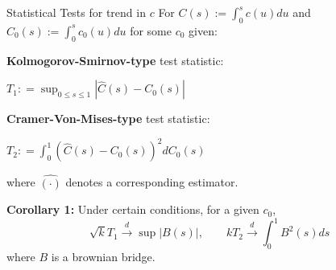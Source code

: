 \documentclass[notes]{beamer}
\begin{document}
\begin{frame}{Statistical Tests for trend in $c$}
For $C(s) := \displaystyle \int_0^s c (u) du$ and $C_0(s) := \displaystyle \int_0^s c_0 (u) du $ for some $c_0$ given: \pause

\textbf{Kolmogorov-Smirnov-type} test statistic:
\begin{center} {$T_1 : = \displaystyle \sup_{0 \le s \le 1} | \hat{C}(s) - C_0 (s) |$} \end{center}

\textbf{Cramer-Von-Mises-type} test statistic:
\begin{center} {$T_2 : = \displaystyle \int_0^1 \left( \hat{C}(s) - C_0 (s) \right)^2 dC_0(s)$} \end{center}


where $\hat{(\cdot)}$ denotes a corresponding estimator. \pause


\textbf{Corollary 1:} Under certain conditions, for a given $c_0$, 
\begin{equation*} \sqrt k T_1 \xrightarrow{d} \sup |B(s)|, \qquad  kT_2 \xrightarrow{d} \int_0^1 B^2(s) ds \end{equation*} 
where $B$ is a brownian bridge.
%
\end{frame}


\end{document}
